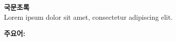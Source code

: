 \thispagestyle{plain}
\begin{center}
  \Large{
    \textbf{국문초록} \\
  }
  \normalsize
  Lorem ipsum dolor sit amet, consectetur adipiscing elit.
\end{center}
\textbf{주요어: }
\vfill

